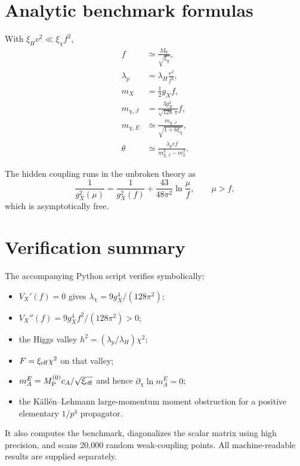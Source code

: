 \documentclass[11pt,a4paper]{article}
\newcommand{\MP}{M_{\mathrm P}}
\begin{document}
\section{Analytic benchmark formulas}

With $\xi_Hv^2\ll\xi_\chi f^2$,
\begin{align}
f&\simeq\frac{\MP}{\sqrt{\xi_\chi}},\\
\lambda_p&=\lambda_H\frac{v^2}{f^2},\\
m_X&=\frac12g_Xf,\\
m_{\chi,J}&=\frac{3g_X^2}{\sqrt{128}\,\pi}f,\\
m_{\chi,E}&\simeq\frac{m_{\chi,J}}{\sqrt{1+6\xi_\chi}},\\
\theta&\simeq\frac{\lambda_pvf}{m_{\chi,J}^2-m_h^2}.
\end{align}

The hidden coupling runs in the unbroken theory as
\begin{equation}
\frac1{g_X^2(\mu)}=
\frac1{g_X^2(f)}+
\frac{43}{48\pi^2}\ln\frac{\mu}{f},
\qquad \mu>f,
\end{equation}
which is asymptotically free.

\section{Verification summary}

The accompanying Python script verifies symbolically:

\begin{itemize}
  \item $V_X'(f)=0$ gives $\lambda_\chi=9g_X^4/(128\pi^2)$;
  \item $V_X''(f)=9g_X^4f^2/(128\pi^2)>0$;
  \item the Higgs valley $h^2=(\lambda_p/\lambda_H)\chi^2$;
  \item $F=\xi_{\rm eff}\chi^2$ on that valley;
  \item $m_A^E=\MP^{(0)}c_A/\sqrt{\xi_{\rm eff}}$ and hence $\partial_\chi\ln m_A^E=0$;
  \item the K\"all\'en--Lehmann large-momentum moment obstruction for a positive elementary $1/p^4$ propagator.
\end{itemize}

It also computes the benchmark, diagonalizes the scalar matrix using high precision, and scans 20,000 random weak-coupling points. All machine-readable results are supplied separately.
\end{document}
